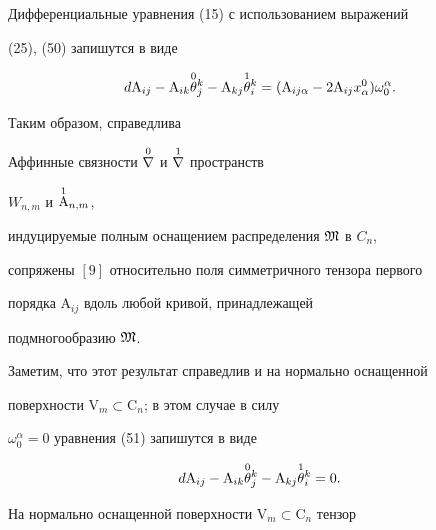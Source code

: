  


Дифференциальные уравнения (15) с использованием выражений 


(25), (50) запишутся в виде 


\begin{equation} 


d\mathrm A_{i j}-\mathrm A_{i k}\up{0}{\theta}^k_j- 


\mathrm A_{k j}\up{1}{\theta}^k_i=(\mathrm A_{i j\alpha}- 


2\mathrm A_{i j}x^0_\alpha)\omega^\alpha_0. 


\end{equation} 


 


Таким образом, справедлива 


 


\begin{thm} 


Аффинные связности $\overset{0}{\nabla}{}$ и $\overset{1}{\nabla}{}$ пространств 


$W_{n,m}$ и $\overset{1}{\mathrm A}{}_{n,m}$, 


индуцируемые полным оснащением распределения $\frak M$ в $C_n$, 


сопряжены $[9]$ относительно поля симметричного тензора первого 


порядка $\mathrm A_{i j}$ вдоль любой кривой, принадлежащей 


подмногообразию $\frak M$. 


\end{thm} 


 


Заметим, что этот результат справедлив и на нормально оснащенной 


поверхности $\mathrm V_m\subset\mathrm C_n$; в этом случае в силу 


$\omega^\alpha_0=0$ уравнения (51) запишутся в виде


\begin{equation} 


d\mathrm A_{i j}-\mathrm A_{i k}\up{0}{\theta}^k_j- 


\mathrm A_{k j}\up{1}{\theta}^k_i=0. 


\end{equation} 


 


На нормально оснащенной поверхности $\mathrm V_m\subset\mathrm C_n$ тензор 


